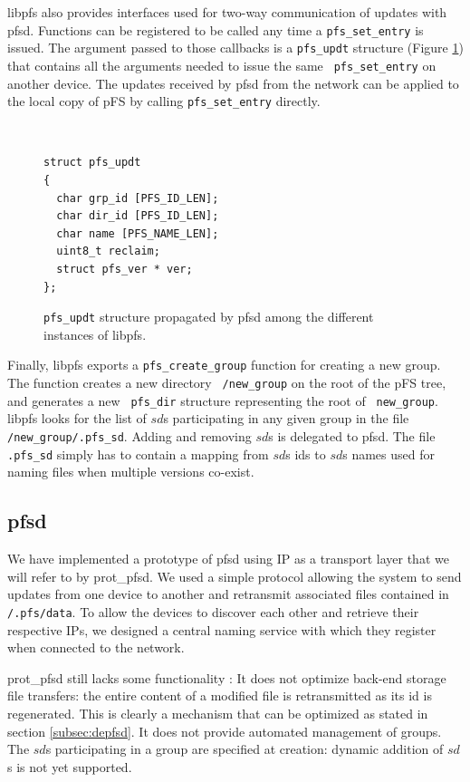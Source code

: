 libpfs also provides interfaces used for two-way communication of
updates with pfsd. Functions can be registered to be called any time a
{\tt pfs\_set\_entry} is issued. The argument passed to those
callbacks is a {\tt pfs\_updt} structure (Figure \ref{PfsUpdt}) that
contains all the arguments needed to issue the same {\tt
  pfs\_set\_entry} on another device. The updates received by pfsd
from the network can be applied to the local copy of pFS by calling
{\tt pfs\_set\_entry} directly.

\begin{figure}[ht]
\begin{center}
{\tt \small
\begin{verbatim}
struct pfs_updt
{
  char grp_id [PFS_ID_LEN];
  char dir_id [PFS_ID_LEN];  
  char name [PFS_NAME_LEN];
  uint8_t reclaim;
  struct pfs_ver * ver;
};
\end{verbatim}
}
\end{center}
\caption{\label{PfsUpdt}
{\small {\tt pfs\_updt} structure propagated by pfsd among the
    different instances of libpfs.}}
\end{figure}

Finally, libpfs exports a {\tt pfs\_create\_group} function for
creating a new group. The function creates a new directory {\tt
  /new\_group} on the root of the pFS tree, and generates a new {\tt
  pfs\_dir} structure representing the root of {\tt
  new\_group}. libpfs looks for the list of $sd$s participating in any
given group in the file {\tt /new\_group/.pfs\_sd}. Adding and
removing $sd$s is delegated to pfsd. The file {\tt .pfs\_sd} simply
has to contain a mapping from $sd$s ids to $sd$s names used for naming files
when multiple versions co-exist.

\subsection {pfsd}

We have implemented a prototype of pfsd using IP as a transport layer
that we will refer to by prot\_pfsd. We used a simple protocol
allowing the system to send updates from one device to another and
retransmit associated files contained in {\tt /.pfs/data}. To allow
the devices to discover each other and retrieve their respective IPs,
we designed a central naming service with which they register when
connected to the network.

prot\_pfsd still lacks some functionality : It does not optimize
back-end storage file transfers: the entire content of a modified file
is retransmitted as its id is regenerated. This is clearly a mechanism
that can be optimized as stated in section \ref{subsec:depfsd}. It
does not provide automated management of groups. The $sd$s
participating in a group are specified at creation: dynamic addition of
$sd$s is not yet supported.

